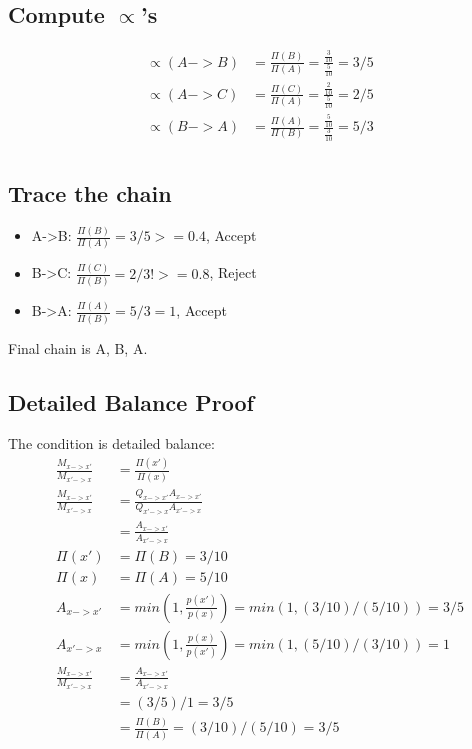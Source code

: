 \documentclass[11pt]{article}
\begin{document}
\subsection{Compute $\propto$'s}

\begin{align}
	\propto(A->B) &= \frac{\Pi(B)}{\Pi(A)} = \frac{\frac{3}{10}}{\frac{5}{10}} = 3/5 \\
	\propto(A->C) &= \frac{\Pi(C)}{\Pi(A)} = \frac{\frac{2}{10}}{\frac{5}{10}} = 2/5 \\	
	\propto(B->A) &= \frac{\Pi(A)}{\Pi(B)} = \frac{\frac{5}{10}}{\frac{3}{10}} = 5/3 \\		
\end{align}

\subsection{Trace the chain}

\begin{itemize}
	\item A-\textgreater B: $\frac{\Pi(B)}{\Pi(A)} = 3/5 >= 0.4$, Accept
	\item B-\textgreater C: $\frac{\Pi(C)}{\Pi(B)} = 2/3 !>= 0.8$, Reject
	\item B-\textgreater A: $\frac{\Pi(A)}{\Pi(B)} = 5/3 = 1$, Accept		
\end{itemize}

Final chain is A, B, A.

\subsection{Detailed Balance Proof}

The condition is detailed balance:
\begin{align}
	\frac{M_{x->x'}}{M_{x'->x}} &= \frac{\Pi(x')}{\Pi(x)} \\
	\frac{M_{x->x'}}{M_{x'->x}} &= \frac{Q_{x->x'} A_{x->x'}}{Q_{x'->x} A_{x'->x}} \\
	&= \frac{A_{x->x'}}{A_{x'->x}} \\
	\Pi(x') &= \Pi(B) = 3/10 \\
	\Pi(x) &= \Pi(A) = 5/10 \\
	 A_{x->x'} &= min(1, \frac{p(x')}{p(x)}) = min(1, (3/10)/(5/10)) = 3/5 \\
	 A_{x'->x} &= min(1, \frac{p(x)}{p(x')}) = min(1, (5/10)/(3/10)) = 1 \\
	 \frac{M_{x->x'}}{M_{x'->x}} &= \frac{A_{x->x'}}{A_{x'->x}}  \\
	 &= (3/5)/1 = 3/5 \\
	 &=  \frac{\Pi(B)}{\Pi(A)} = (3/10)/(5/10) = 3/5 \\
\end{align}
\end{document}
